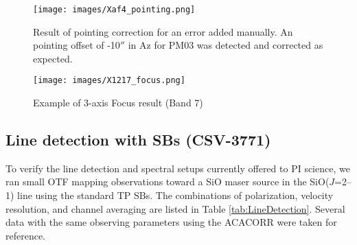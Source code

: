 \begin{figure}[htbp]
     \centering
     \texttt{[image: images/Xaf4\_pointing.png]}
     \caption{Result of pointing correction for an error added manually. An pointing offset of -10$''$ in Az for PM03 was detected and corrected as expected.}
     \label{fig:pointing}
\end{figure}

\begin{figure}[htbp]
     \centering
     \texttt{[image: images/X1217\_focus.png]}
     \caption{Example of 3-axis Focus result (Band 7)}
     \label{fig:focus}
\end{figure}


\subsection{Line detection with SBs (CSV-3771)}

To verify the line detection and spectral setups currently offered to PI science, we ran small OTF mapping observations toward a SiO maser source in the SiO($J$=2--1) line using the standard TP SBs. The combinations of polarization, velocity resolution, and channel averaging are listed in Table \ref{tab:LineDetection}. Several data with the same observing parameters using the ACACORR were taken for reference. 

